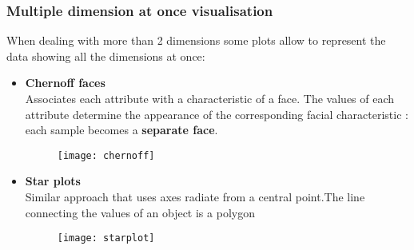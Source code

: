 \subsubsection{Multiple dimension at once visualisation}
When dealing with more than 2 dimensions some plots allow to represent the data showing all the dimensions at once:
\begin{itemize}
\item \textbf{Chernoff faces}\\
Associates each attribute with a characteristic of a face. The values of each attribute determine the appearance of the corresponding facial characteristic : each sample becomes a \textbf{separate face}.
\begin{figure}[H]
 \centering
 \texttt{[image: chernoff]}
\end{figure}
\item \textbf{Star plots}\\
Similar approach that uses axes radiate from a central point.The line connecting the values of an object is a polygon
\begin{figure}[H]
 \centering
 \texttt{[image: starplot]}
\end{figure}
\end{itemize}

